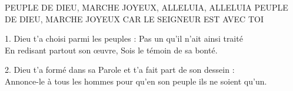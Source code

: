 PEUPLE DE DIEU, MARCHE JOYEUX, 
ALLELUIA, ALLELUIA
PEUPLE DE DIEU, MARCHE JOYEUX 
CAR LE SEIGNEUR EST AVEC TOI

1. Dieu t’a choisi parmi les peuples : Pas un qu’il n’ait ainsi traité\\
En redisant partout son œuvre, Sois le témoin de sa bonté.

2. Dieu t’a formé dans sa Parole et t’a fait part de son dessein :\\
Annonce-le à tous les hommes pour qu’en son peuple ils ne soient qu’un.

